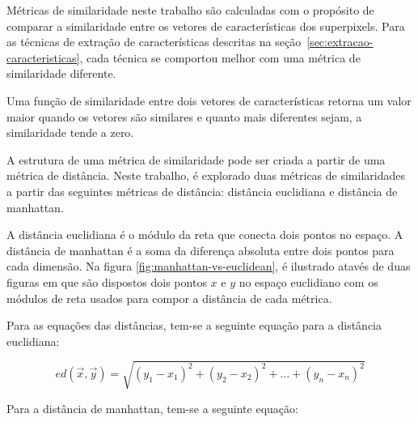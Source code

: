 Métricas de similaridade neste trabalho são calculadas com o propósito
de comparar a similaridade entre os vetores de características dos
superpixels. Para as técnicas de extração de características descritas
na seção~\ref{sec:extracao-caracteristicas}, cada técnica se comportou
melhor com uma métrica de similaridade diferente.

Uma função de similaridade entre dois vetores de características
retorna um valor maior quando os vetores são similares e quanto mais
diferentes sejam, a similaridade tende a zero.

A estrutura de uma métrica de similaridade pode ser criada a partir de
uma métrica de distância. Neste trabalho, é explorado duas métricas de
similaridades a partir das seguintes métricas de distância: distância
euclidiana e distância de manhattan.

A distância euclidiana é o módulo da reta que conecta dois pontos no
espaço. A distância de manhattan é a soma da diferença absoluta entre
dois pontos para cada dimensão. Na figura
\ref{fig:manhattan-vs-euclidean}, é ilustrado atavés de duas figuras
em que são dispostos dois pontos $ x $ e $ y $ no espaço euclidiano
com os módulos de reta usados para compor a distância de cada métrica.

\begin{figure}[!h]
        \captionsetup{width=8cm}
		\centering
\end{figure}
\FloatBarrier{}

Para as equações das distâncias, tem-se a seguinte equação para a
distância euclidiana:

\begin{equation}\label{eq:euclidian-distance}
ed(\vec{x}, \vec{y}) = \sqrt{{(y_1-x_1)}^2 + {(y_2-x_2)}^2 + \ldots + {(y_n-x_n)}^2}
\end{equation}

Para a distância de manhattan, tem-se a seguinte equação:

